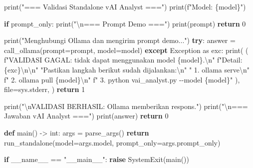 \documentclass[
  indonesian,
  letterpaper,
  DIV=11,
  numbers=noendperiod]{scrreprt}
\newenvironment{Shaded}{\begin{snugshade}}{\end{snugshade}}
\newcommand{\BuiltInTok}[1]{\textcolor[rgb]{0.00,0.23,0.31}{#1}}
\newcommand{\CharTok}[1]{\textcolor[rgb]{0.13,0.47,0.30}{#1}}
\newcommand{\ControlFlowTok}[1]{\textcolor[rgb]{0.00,0.23,0.31}{\textbf{#1}}}
\newcommand{\DecValTok}[1]{\textcolor[rgb]{0.68,0.00,0.00}{#1}}
\newcommand{\ImportTok}[1]{\textcolor[rgb]{0.00,0.46,0.62}{#1}}
\newcommand{\KeywordTok}[1]{\textcolor[rgb]{0.00,0.23,0.31}{\textbf{#1}}}
\newcommand{\NormalTok}[1]{\textcolor[rgb]{0.00,0.23,0.31}{#1}}
\newcommand{\OperatorTok}[1]{\textcolor[rgb]{0.37,0.37,0.37}{#1}}
\newcommand{\PreprocessorTok}[1]{\textcolor[rgb]{0.68,0.00,0.00}{#1}}
\newcommand{\SpecialCharTok}[1]{\textcolor[rgb]{0.37,0.37,0.37}{#1}}
\newcommand{\SpecialStringTok}[1]{\textcolor[rgb]{0.13,0.47,0.30}{#1}}
\newcommand{\StringTok}[1]{\textcolor[rgb]{0.13,0.47,0.30}{#1}}
\newcommand{\VariableTok}[1]{\textcolor[rgb]{0.07,0.07,0.07}{#1}}
\begin{document}
\begin{Shaded}
\begin{Highlighting}[]
    \BuiltInTok{print}\NormalTok{(}\StringTok{"=== Validasi Standalone vAI Analyst ==="}\NormalTok{)}
    \BuiltInTok{print}\NormalTok{(}\SpecialStringTok{f"Model: }\SpecialCharTok{\{}\NormalTok{model}\SpecialCharTok{\}}\SpecialStringTok{"}\NormalTok{)}

    \ControlFlowTok{if}\NormalTok{ prompt\_only:}
        \BuiltInTok{print}\NormalTok{(}\StringTok{"}\CharTok{\textbackslash{}n}\StringTok{=== Prompt Demo ==="}\NormalTok{)}
        \BuiltInTok{print}\NormalTok{(prompt)}
        \ControlFlowTok{return} \DecValTok{0}

    \BuiltInTok{print}\NormalTok{(}\StringTok{"Menghubungi Ollama dan mengirim prompt demo..."}\NormalTok{)}
    \ControlFlowTok{try}\NormalTok{:}
\NormalTok{        answer }\OperatorTok{=}\NormalTok{ call\_ollama(prompt}\OperatorTok{=}\NormalTok{prompt, model}\OperatorTok{=}\NormalTok{model)}
    \ControlFlowTok{except} \PreprocessorTok{Exception} \ImportTok{as}\NormalTok{ exc:}
        \BuiltInTok{print}\NormalTok{(}
\NormalTok{            (}
                \SpecialStringTok{f"VALIDASI GAGAL: tidak dapat menggunakan model \textquotesingle{}}\SpecialCharTok{\{}\NormalTok{model}\SpecialCharTok{\}}\SpecialStringTok{\textquotesingle{}.}\CharTok{\textbackslash{}n}\SpecialStringTok{"}
                \SpecialStringTok{f"Detail: }\SpecialCharTok{\{}\NormalTok{exc}\SpecialCharTok{\}}\CharTok{\textbackslash{}n\textbackslash{}n}\SpecialStringTok{"}
                \StringTok{"Pastikan langkah berikut sudah dijalankan:}\CharTok{\textbackslash{}n}\StringTok{"}
                \StringTok{"  1. ollama serve}\CharTok{\textbackslash{}n}\StringTok{"}
                \SpecialStringTok{f"  2. ollama pull }\SpecialCharTok{\{}\NormalTok{model}\SpecialCharTok{\}}\CharTok{\textbackslash{}n}\SpecialStringTok{"}
                \SpecialStringTok{f"  3. python vai\_analyst.py {-}{-}model }\SpecialCharTok{\{}\NormalTok{model}\SpecialCharTok{\}}\SpecialStringTok{"}
\NormalTok{            ),}
            \BuiltInTok{file}\OperatorTok{=}\NormalTok{sys.stderr,}
\NormalTok{        )}
        \ControlFlowTok{return} \DecValTok{1}

    \BuiltInTok{print}\NormalTok{(}\StringTok{"}\CharTok{\textbackslash{}n}\StringTok{VALIDASI BERHASIL: Ollama memberikan respons."}\NormalTok{)}
    \BuiltInTok{print}\NormalTok{(}\StringTok{"}\CharTok{\textbackslash{}n}\StringTok{=== Jawaban vAI Analyst ==="}\NormalTok{)}
    \BuiltInTok{print}\NormalTok{(answer)}
    \ControlFlowTok{return} \DecValTok{0}


\KeywordTok{def}\NormalTok{ main() }\OperatorTok{{-}\textgreater{}} \BuiltInTok{int}\NormalTok{:}
\NormalTok{    args }\OperatorTok{=}\NormalTok{ parse\_args()}
    \ControlFlowTok{return}\NormalTok{ run\_standalone(model}\OperatorTok{=}\NormalTok{args.model, prompt\_only}\OperatorTok{=}\NormalTok{args.prompt\_only)}


\ControlFlowTok{if} \VariableTok{\_\_name\_\_} \OperatorTok{==} \StringTok{"\_\_main\_\_"}\NormalTok{:}
    \ControlFlowTok{raise} \PreprocessorTok{SystemExit}\NormalTok{(main())}
\end{Highlighting}
\end{Shaded}
\end{document}
